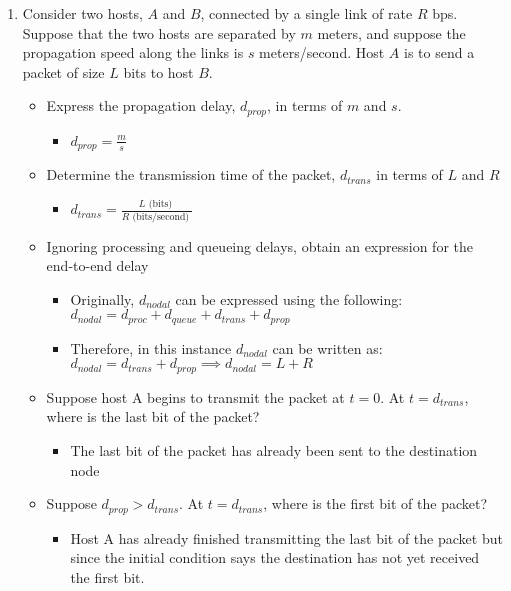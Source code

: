 \documentclass{article}
\begin{document}
\begin{enumerate}
\item Consider two hosts, $A$ and $B$, connected by a single link of rate $R$ bps. Suppose that the two hosts are separated by $m$ meters, and suppose the propagation speed along the links is $s$ meters/second. Host $A$ is to send a packet of size $L$ bits to host $B$.
\begin{itemize}
\item Express the propagation delay, $d_{prop}$, in terms of $m$ and $s$.

\begin{itemize}
\item $d_{prop} = \frac{m}{s}$
\end{itemize}

\item Determine the transmission time of the packet, $d_{trans}$ in terms of $L$ and $R$
\begin{itemize}
\item $d_{trans} = \frac{L \text{ (bits) }}{R \text{ (bits/second) }}$
\end{itemize}

\item Ignoring processing and queueing delays, obtain an expression for the end-to-end delay
\begin{itemize}
\item Originally, $d_{nodal}$ can be expressed using the following: $d_{nodal} = d_{proc} + d_{queue} + d_{trans} + d_{prop}$
\item Therefore, in this instance $d_{nodal}$ can be written as: $d_{nodal} = d_{trans} + d_{prop} \implies d_{nodal} = L + R$
\end{itemize}

\newpage

\item Suppose host A begins to transmit the packet at $t = 0$. At $t = d_{trans}$, where is the last bit of the packet?
\begin{itemize}
\item The last bit of the packet has already been sent to the destination node
\end{itemize}

\item Suppose $d_{prop} > d_{trans}$. At $t = d_{trans}$, where is the first bit of the packet?
\begin{itemize}
\item Host A has already finished transmitting the last bit of the packet but since the initial condition says the destination has not yet received the first bit.
\end{itemize}


\end{itemize}
\end{enumerate}
\end{document}
